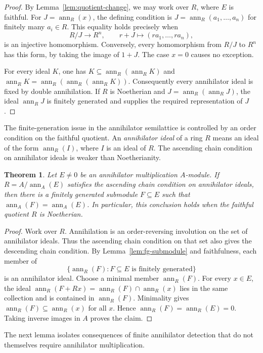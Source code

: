\documentclass[11pt]{amsart}
\theoremstyle{plain}
\newtheorem{theorem}{Theorem}[section]
\theoremstyle{definition}
\theoremstyle{remark}
\newcommand{\ann}{\operatorname{ann}}
\numberwithin{equation}{section}
\begin{document}
\begin{proof}
By Lemma~\ref{lem:quotient-change}, we may work over $R$, where $E$ is
faithful. For $J=\ann_R(x)$, the defining condition is
$J=\ann_R(a_1,\ldots,a_n)$ for finitely many $a_i\in R$.
This equality holds precisely when
\[
 R/J\longrightarrow R^n,\qquad r+J\longmapsto(ra_1,\ldots,ra_n),
\]
is an injective homomorphism. Conversely, every homomorphism from $R/J$
to $R^n$ has this form, by taking the image of $1+J$.
The case $x=0$ causes no exception.

For every ideal $K$, one has $K\subseteq\ann_R(\ann_R K)$ and
$\ann_R K=\ann_R(\ann_R(\ann_R K))$.
Consequently every annihilator ideal is fixed by double annihilation.
If $R$ is Noetherian and $J=\ann_R(\ann_R J)$, the ideal $\ann_R J$
is finitely generated and supplies the required representation of $J$.
\end{proof}

The finite-generation issue in the annihilator semilattice is controlled
by an order condition on the faithful quotient. An \emph{annihilator
ideal} of a ring $R$ means an ideal of the form $\ann_R(I)$, where $I$
is an ideal of $R$. The ascending chain condition on annihilator ideals
is weaker than Noetherianity.

\begin{theorem}\label{thm:finite-detection-acc}
Let $E\ne0$ be an annihilator multiplication $A$-module. If
$R=A/\ann_A(E)$ satisfies the ascending chain condition on annihilator
ideals, then there is a finitely generated submodule $F\subseteq E$
such that $\ann_A(F)=\ann_A(E)$. In particular, this conclusion holds
when the faithful quotient $R$ is Noetherian.
\end{theorem}

\begin{proof}
Work over $R$. Annihilation is an order-reversing involution on the
set of annihilator ideals. Thus the ascending chain condition on that
set also gives the descending chain condition. By
Lemma~\ref{lem:fg-submodule} and faithfulness, each member of
\[
 \{\ann_R(F):F\subseteq E\text{ is finitely generated}\}
\]
is an annihilator ideal. Choose a minimal member $\ann_R(F)$.
For every $x\in E$, the ideal
$\ann_R(F+Rx)=\ann_R(F)\cap\ann_R(x)$ lies in the same collection
and is contained in $\ann_R(F)$. Minimality gives
$\ann_R(F)\subseteq\ann_R(x)$ for all $x$. Hence
$\ann_R(F)=\ann_R(E)=0$. Taking inverse images in $A$ proves the claim.
\end{proof}

The next lemma isolates consequences of finite annihilator detection
that do not themselves require annihilator multiplication.
\end{document}
